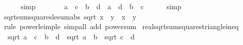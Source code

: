 \begin{isabellebody}
\ \ \ \ \isamarkupfalse%
\ simp\isanewline
\ \ \isamarkupfalse%
\ \isamarkupfalse%
\ {\isachardoublequoteopen}{}\ {\isacharasterisk}{\kern0pt}\ {\isacharparenleft}{\kern0pt}a\ {\isacharasterisk}{\kern0pt}\ c{\isacharparenright}{\kern0pt}\ {\isacharasterisk}{\kern0pt}\ {\isacharparenleft}{\kern0pt}b\ {\isacharasterisk}{\kern0pt}\ d{\isacharparenright}{\kern0pt}\ {\isasymle}\ a\ {\isacharasterisk}{\kern0pt}\ d\ {\isacharplus}{\kern0pt}\ b\ {\isacharasterisk}{\kern0pt}\ c\isanewline
\ \ \ \ \isamarkupfalse%
\ simp\isanewline
{}\isamarkupfalse%
%
\endisatagproof
{\isafoldproof}%
%
\isadelimproof
\isanewline
%
\endisadelimproof
\isanewline
{}\isamarkupfalse%
\ sqrt{\isacharunderscore}{\kern0pt}sum{\isacharunderscore}{\kern0pt}squares{\isacharunderscore}{\kern0pt}le{\isacharunderscore}{\kern0pt}sum{\isacharunderscore}{\kern0pt}abs{\isacharcolon}{\kern0pt}\ {\isachardoublequoteopen}sqrt\ {\isacharparenleft}{\kern0pt}x\ {\isacharplus}{\kern0pt}\ y\ {\isasymle}\ {\isasymbar}x{\isasymbar}\ {\isacharplus}{\kern0pt}\ {\isasymbar}y{\isasymbar}{\isachardoublequoteclose}\isanewline
%
\isadelimproof
\ \ %
\endisadelimproof
%
\isatagproof
{}\isamarkupfalse%
\ {\isacharparenleft}{\kern0pt}rule\ power{}{\isacharunderscore}{\kern0pt}le{\isacharunderscore}{\kern0pt}imp{\isacharunderscore}{\kern0pt}le{\isacharparenright}{\kern0pt}\ {\isacharparenleft}{\kern0pt}simp{\isacharunderscore}{\kern0pt}all\ add{\isacharcolon}{\kern0pt}\ power{}{\isacharunderscore}{\kern0pt}sum{\isacharparenright}{\kern0pt}%
\endisatagproof
{\isafoldproof}%
%
\isadelimproof
\isanewline
%
\endisadelimproof
\isanewline
{}\isamarkupfalse%
\ real{\isacharunderscore}{\kern0pt}sqrt{\isacharunderscore}{\kern0pt}sum{\isacharunderscore}{\kern0pt}squares{\isacharunderscore}{\kern0pt}triangle{\isacharunderscore}{\kern0pt}ineq{\isacharcolon}{\kern0pt}\isanewline
\ \ {\isachardoublequoteopen}sqrt\ {\isacharparenleft}{\kern0pt}{\isacharparenleft}{\kern0pt}a\ {\isacharplus}{\kern0pt}\ c{\isacharparenright}{\kern0pt}\ {\isacharplus}{\kern0pt}\ {\isacharparenleft}{\kern0pt}b\ {\isacharplus}{\kern0pt}\ d{\isacharparenright}{\kern0pt}\ {\isasymle}\ sqrt\ {\isacharparenleft}{\kern0pt}a\ {\isacharplus}{\kern0pt}\ b\ {\isacharplus}{\kern0pt}\ sqrt\ {\isacharparenleft}{\kern0pt}c\ {\isacharplus}{\kern0pt}\ d\isanewline

\end{isabellebody}

